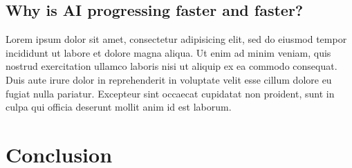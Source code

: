 \documentclass[11pt]{article}
\begin{document}
\subsection{Why is AI progressing faster and faster?}

Lorem ipsum dolor sit amet, consectetur adipisicing elit, sed do eiusmod tempor incididunt ut labore et dolore magna aliqua. Ut enim ad minim veniam, quis nostrud exercitation ullamco laboris nisi ut aliquip ex ea commodo consequat. Duis aute irure dolor in reprehenderit in voluptate velit esse cillum dolore eu fugiat nulla pariatur. Excepteur sint occaecat cupidatat non proident, sunt in culpa qui officia deserunt mollit anim id est laborum.


\section{Conclusion}\label{conclusion}



\end{document}
